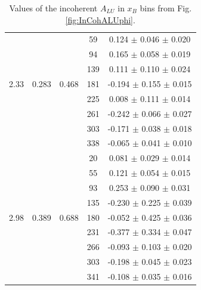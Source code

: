 \documentclass{article}
\begin{document}
\begin{table}[!h]
\begin{center}
\begin{tabular}{|c|c|c|c|c|}
        &       &       &  59    &  0.124  $\pm$ 0.046   $\pm$  0.020  \\
        &       &       &  94    &  0.165  $\pm$ 0.058   $\pm$  0.019  \\
        &       &       & 139    &  0.111  $\pm$ 0.110   $\pm$  0.024  \\
  2.33  & 0.283 & 0.468 & 181    & -0.194  $\pm$ 0.155   $\pm$  0.015  \\
        &       &       & 225    &  0.008  $\pm$ 0.111   $\pm$  0.014  \\
        &       &       & 261    & -0.242  $\pm$ 0.066   $\pm$  0.027  \\
        &       &       & 303    & -0.171  $\pm$ 0.038   $\pm$  0.018  \\
        &       &       & 338    & -0.065  $\pm$ 0.041   $\pm$  0.010  \\
  \hline
        &       &       &  20    &  0.081  $\pm$ 0.029   $\pm$  0.014  \\
        &       &       &  55    &  0.121  $\pm$ 0.054   $\pm$  0.015  \\
        &       &       &  93    &  0.253  $\pm$ 0.090   $\pm$  0.031  \\
        &       &       & 135    & -0.230  $\pm$ 0.225   $\pm$  0.039  \\
  2.98  & 0.389 & 0.688 & 180    & -0.052  $\pm$ 0.425   $\pm$  0.036  \\
        &       &       & 231    & -0.377  $\pm$ 0.334   $\pm$  0.047  \\
        &       &       & 266    & -0.093  $\pm$ 0.103   $\pm$  0.020  \\
        &       &       & 303    & -0.198  $\pm$ 0.045   $\pm$  0.023  \\
        &       &       & 341    & -0.108  $\pm$ 0.035   $\pm$  0.016  \\
 \hline
 \end{tabular}
 \caption{Values of the incoherent $A_{LU}$ in $x_B$ bins from Fig. \ref{fig:InCohALUphi}.}
 \label{table:InCoh_xB_BSA}
 \end{center}
\end{table}
\end{document}
